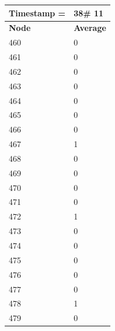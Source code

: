 \begin{tabular}{|l||l|}
\hline
\textbf{Timestamp =} & \textbf{38}\# 11\\\hline
	\textbf{Node} & \textbf{Average} \\ \hline
\hline
	460 & 0 \\ \hline
	461 & 0 \\ \hline
	462 & 0 \\ \hline
	463 & 0 \\ \hline
	464 & 0 \\ \hline
	465 & 0 \\ \hline
	466 & 0 \\ \hline
	467 & 1 \\ \hline
	468 & 0 \\ \hline
	469 & 0 \\ \hline
	470 & 0 \\ \hline
	471 & 0 \\ \hline
	472 & 1 \\ \hline
	473 & 0 \\ \hline
	474 & 0 \\ \hline
	475 & 0 \\ \hline
	476 & 0 \\ \hline
	477 & 0 \\ \hline
	478 & 1 \\ \hline
	479 & 0 \\ \hline
\end{tabular}


